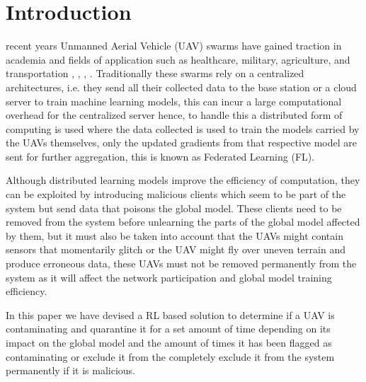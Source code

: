 \documentclass[10pt,journal,compsoc]{IEEEtran}
\begin{document}
\IEEEdisplaynontitleabstractindextext

\IEEEpeerreviewmaketitle


\ifCLASSOPTIONcompsoc
{}
\else
\section{Introduction}
\label{sec:introduction}
\fi
{} recent years Unmanned Aerial Vehicle (UAV) swarms have gained traction in academia and fields of application such as healthcare, military, agriculture, and transportation \cite{healthcare}, \cite{military}, \cite{agri}, \cite{transport}. Traditionally these swarms rely on a centralized architectures, i.e. they send all their collected data to the base station or a cloud server to train machine learning models, this can incur a large computational overhead for the centralized server hence, to handle this a distributed form of computing is used where the data collected is used to train the models carried by the UAVs themselves, only the updated gradients from that respective model are sent for further aggregation, this is known as Federated Learning (FL). 

Although distributed learning models improve the efficiency of computation, they can be exploited by introducing malicious clients which seem to be part of the system but send data that poisons the global model. These clients need to be removed from the system before unlearning the parts of the global model affected by them, but it must also be taken into account that the UAVs might contain sensors that momentarily glitch or the UAV might fly over uneven terrain and produce erroneous data, these UAVs must not be removed permanently from the system as it will affect the network participation and global model training efficiency.

In this paper we have devised a RL based solution to determine if a UAV is contaminating and quarantine it for a set amount of time depending on its impact on the global model and the amount of times it has been flagged as contaminating or exclude it from the completely exclude it from the system permanently if it is malicious.  
\end{document}
